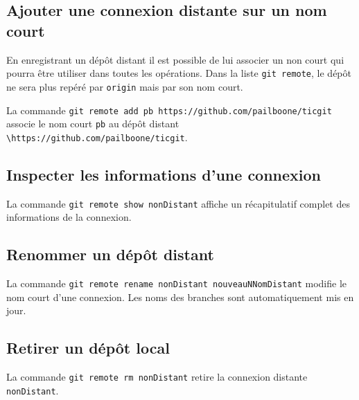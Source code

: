\documentclass[11pt,twoside,headings=normal,open=right,french,DIV=12]{scrreprt}
\newcommand{\img}[2]{\texttt{[image: \#2]}}
\newcommand{\info}[1]{
    \begin{minipage}{\textwidth}
	    \begin{minipage}[c]{0.1\linewidth}
		    \centering\img{0.1}{../images/info}
        \end{minipage}    
		\begin{minipage}[c]{0.8\linewidth}
		    #1
        \end{minipage}
    \end{minipage}
	}
\begin{document}
\subsection{Ajouter une connexion distante sur un nom court}



    En enregistrant un dépôt distant il est possible de lui associer un non court qui pourra être utiliser dans toutes
    les opérations. Dans la liste \verb|git remote|, le dépôt ne sera plus repéré par \verb|origin| mais par son nom court.
    
    \smallskip
    
    La commande \verb|git remote add pb https://github.com/pailboone/ticgit| associe le nom court \verb|pb| au dépôt distant \verb|\https://github.com/pailboone/ticgit|.



\subsection{Inspecter les informations d'une connexion}



    La commande \verb|git remote show nonDistant| affiche un récapitulatif complet des informations de la connexion.




\subsection{Renommer un dépôt distant}



    La commande \verb|git remote rename nonDistant nouveauNNomDistant| modifie le nom court d'une connexion. Les noms des branches sont automatiquement mis en jour.




\subsection{Retirer un dépôt local}


    La commande \verb|git remote rm nonDistant| retire la connexion distante \verb|nonDistant|.
\end{document}
